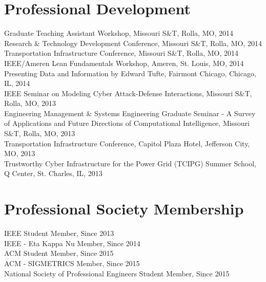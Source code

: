 \documentclass[10pt]{article}
\newlength{\Vspace}
\newlength{\Vspace}
\begin{document}
\ifResume
\else
\section{Professional Development}
\begin{flushleft}
Graduate Teaching Assistant Workshop, Missouri S\&T, Rolla, MO, 2014 \vspace{\Vspace} \\
Research \& Technology Development Conference, Missouri S\&T, Rolla, MO, 2014 \vspace{\Vspace} \\
Transportation Infrastructure Conference, Missouri S\&T, Rolla, MO, 2014 \vspace{\Vspace} \\
IEEE/Ameren Lean Fundamentals Workshop, Ameren, St. Louis, MO, 2014 \vspace{\Vspace} \\
Presenting Data and Information by Edward Tufte, Fairmont Chicago, Chicago, IL, 2014 \vspace{\Vspace} \\
IEEE Seminar on Modeling Cyber Attack-Defense Interactions, Missouri S\&T, Rolla, MO, 2013 \vspace{\Vspace} \\
Engineering Management \& Systems Engineering Graduate Seminar - A Survey of Applications and Future Directions of Computational Intelligence, Missouri S\&T, Rolla, MO, 2013 \vspace{\Vspace} \\
Transportation Infrastructure Conference, Capitol Plaza Hotel, Jefferson City, MO, 2013 \vspace{\Vspace} \\
Trustworthy Cyber Infrastructure for the Power Grid (TCIPG) Summer School, Q Center, St. Charles, IL, 2013
\end{flushleft}
\fi

\ifResume
\else
\section{Professional Society Membership}
\begin{flushleft}
IEEE Student Member, Since 2013 \vspace{\Vspace} \\
IEEE - Eta Kappa Nu Member, Since 2014 \vspace{\Vspace} \\
ACM Student Member, Since 2015 \vspace{\Vspace} \\
ACM - SIGMETRICS Member, Since 2015 \vspace{\Vspace} \\
National Society of Professional Engineers Student Member, Since 2015
\end{flushleft}
\fi
\end{document}
